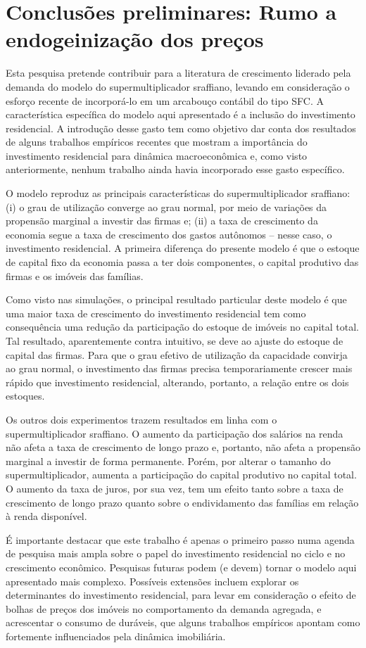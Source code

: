 \section{Conclusões preliminares: Rumo a endogeinização dos preços}\label{Conclusao_Modelo}

Esta pesquisa pretende contribuir para a literatura de crescimento liderado pela demanda do modelo do supermultiplicador sraffiano, levando em consideração o esforço recente de incorporá-lo em um arcabouço contábil do tipo SFC.  A característica específica do modelo aqui apresentado é a inclusão do investimento residencial. A introdução desse gasto tem como objetivo dar conta dos resultados de alguns trabalhos empíricos recentes que mostram a importância do investimento residencial para dinâmica macroeconômica e, como visto anteriormente, nenhum trabalho ainda havia incorporado esse gasto específico. 

O modelo reproduz as principais características do supermultiplicador sraffiano: (i) o grau de utilização converge ao grau normal, por meio de variações da propensão marginal a investir das firmas e; (ii) a taxa de crescimento da economia segue a taxa de crescimento dos gastos autônomos – nesse caso, o investimento residencial. A primeira diferença do  presente modelo é que o estoque de capital fixo da economia passa a ter dois componentes, o capital produtivo das firmas e os imóveis das famílias. 

Como visto nas simulações, o principal resultado particular deste modelo é que uma maior taxa de crescimento do investimento residencial tem como consequência uma redução da participação do estoque de imóveis no capital total. Tal resultado, aparentemente contra intuitivo, se deve ao ajuste do estoque de capital das firmas. Para que o grau efetivo de utilização da capacidade convirja ao grau normal, o investimento das firmas precisa temporariamente crescer mais rápido que investimento residencial, alterando, portanto, a relação entre os dois estoques. 

Os outros dois experimentos trazem resultados em linha com o supermultiplicador sraffiano. O aumento da participação dos salários na renda não afeta a taxa de crescimento de longo prazo e, portanto, não afeta a propensão marginal a investir de forma permanente. Porém, por alterar o tamanho do supermultiplicador, aumenta a participação do capital produtivo no capital total. O aumento da taxa de juros, por sua vez, tem um efeito tanto sobre a taxa de crescimento de longo prazo quanto sobre o endividamento das famílias em relação à renda disponível. 

É importante destacar que este trabalho é apenas o primeiro passo numa agenda de pesquisa mais ampla sobre o papel do investimento residencial no ciclo e no crescimento econômico. Pesquisas futuras podem (e devem) tornar o modelo aqui apresentado mais complexo. Possíveis extensões incluem explorar os determinantes do investimento residencial, para levar em consideração o efeito de bolhas de preços dos imóveis no comportamento da demanda agregada, e acrescentar o consumo de duráveis, que alguns trabalhos empíricos apontam como fortemente influenciados pela dinâmica imobiliária. 
